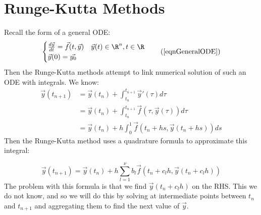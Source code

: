 \documentclass[../Main.tex]{subfiles}
\begin{document}
\section{Runge-Kutta Methods}
Recall the form of a general ODE:
\begin{equation}
    \begin{cases}
        \frac{d\vec{y}}{dt} = \vec{f}(t, \vec{y})  & \vec{y}(t) \in \R^n, t \in \R \\
        \vec{y}(0) = \vec{y_0} & 
    \end{cases}
    \tag{\ref{eqnGeneralODE}}
\end{equation}
Then the Runge-Kutta methods attempt to link numerical solution of such an ODE with integrals. We know:
\begin{align*}
    \vec{y}(t_{n+1}) &= \vec{y}(t_n) + \int_{t_n}^{t_{n+1}} \vec{y}'(\tau) d\tau \\
    &= \vec{y}(t_n) + \int_{t_n}^{t_{n+1}} \vec{f}(\tau, \vec{y}(\tau)) d\tau \\
    &= \vec{y}(t_n) + h \int_0^1 \vec{f}(t_n + hs, \vec{y}(t_n + hs)) ds
\end{align*}
Then the Runge-Kutta method uses a quadrature formula to approximate this integral:

\begin{equation*}
    \vec{y}(t_{n+1}) = \vec{y}(t_n) + h \sum_{l=1}^{\nu} b_l \vec{f}(t_n + c_l h, \vec{y}(t_n + c_l h))
\end{equation*}
The problem with this formula is that we find $\vec{y}(t_n + c_l h)$ on the RHS. This we do not know, and so we will do this by solving at intermediate points between $t_n$ and $t_{n+1}$ and aggregating them to find the next value of $\vec{y}$.
\end{document}
